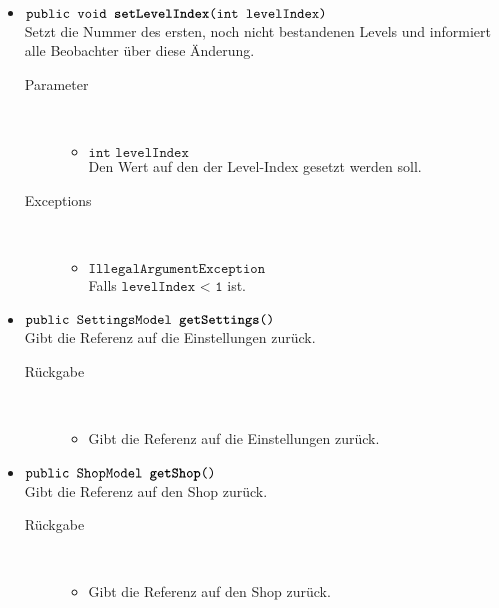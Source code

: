 \begin{description}
\begin{itemize}
		\item $\texttt{public void \textbf{setLevelIndex}(int levelIndex)}$ \\ Setzt die Nummer des ersten, noch nicht bestandenen Levels und informiert alle Beobachter über diese Änderung.
		\begin{description}
			\item[Parameter] \hfill \\
			\vspace{-.8cm}
			\begin{itemize}
				\item $\texttt{int levelIndex}$ \\ Den Wert auf den der Level-Index gesetzt werden soll.		
			\end{itemize}
			\item[Exceptions] \hfill \\
			\vspace{-.8cm}
			\begin{itemize}
				\item $\texttt{IllegalArgumentException}$ \\ Falls $\texttt{levelIndex < 1}$ ist.
			\end{itemize}
		\end{description}
		
		\item $\texttt{public SettingsModel \textbf{getSettings}()}$ \\ Gibt die Referenz auf die Einstellungen zurück.
		\begin{description}
			\item[Rückgabe] \hfill \\
			\vspace{-.8cm}
			\begin{itemize}
				\item Gibt die Referenz auf die Einstellungen zurück.
			\end{itemize}
		\end{description}
		
		\item $\texttt{public ShopModel \textbf{getShop}()}$ \\ Gibt die Referenz auf den Shop zurück.
		\begin{description}
			\item[Rückgabe] \hfill \\
			\vspace{-.8cm}
			\begin{itemize}
				\item Gibt die Referenz auf den Shop zurück.
			\end{itemize}
		\end{description}
		

\end{itemize}
\end{description}
